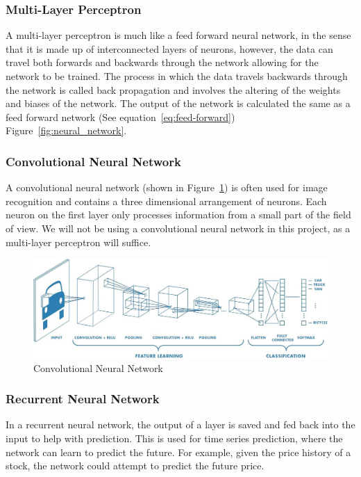 \documentclass[titlepage]{article}
\begin{document}
\subsubsection{Multi-Layer Perceptron}
A multi-layer perceptron is much like a feed forward neural network, in the sense that it is made up of interconnected layers of neurons, however, the data can travel both forwards and backwards through the network allowing for the network to be trained. The process in which the data travels backwards through the network is called back propagation and involves the altering of the weights and biases of the network. The output of the network is calculated the same as a feed forward network (See equation~\ref{eq:feed-forward}) Figure~\ref{fig:neural_network}.

\subsubsection{Convolutional Neural Network}
A convolutional neural network (shown in Figure~\ref{fig:convolutional_neural_network}) is often used for image recognition and contains a three dimensional arrangement of neurons. Each neuron on the first layer only processes information from a small part of the field of view. We will not be using a convolutional neural network in this project, as a multi-layer perceptron will suffice.

\begin{figure}[h!]
    \includegraphics[width=\textwidth]{./assets/convolutional.jpeg}
    \caption{Convolutional Neural Network}
    \label{fig:convolutional_neural_network}
\end{figure}

\subsubsection{Recurrent Neural Network}
In a recurrent neural network, the output of a layer is saved and fed back into the input to help with prediction. This is used for time series prediction, where the network can learn to predict the future. For example, given the price history of a stock, the network could attempt to predict the future price.
\end{document}
